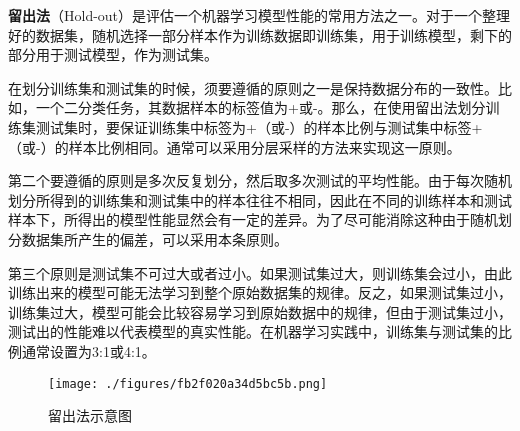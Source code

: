 
\begin{issues}
\issueDraft
\end{issues}

\textbf{留出法}（Hold-out）是评估一个机器学习模型性能的常用方法之一。对于一个整理好的数据集，随机选择一部分样本作为训练数据即训练集，用于训练模型，剩下的部分用于测试模型，作为测试集。

在划分训练集和测试集的时候，须要遵循的原则之一是保持数据分布的一致性。比如，一个二分类任务，其数据样本的标签值为+或-。那么，在使用留出法划分训练集测试集时，要保证训练集中标签为+（或-）的样本比例与测试集中标签+（或-）的样本比例相同。通常可以采用分层采样的方法来实现这一原则。

第二个要遵循的原则是多次反复划分，然后取多次测试的平均性能。由于每次随机划分所得到的训练集和测试集中的样本往往不相同，因此在不同的训练样本和测试样本下，所得出的模型性能显然会有一定的差异。为了尽可能消除这种由于随机划分数据集所产生的偏差，可以采用本条原则。

第三个原则是测试集不可过大或者过小。如果测试集过大，则训练集会过小，由此训练出来的模型可能无法学习到整个原始数据集的规律。反之，如果测试集过小，训练集过大，模型可能会比较容易学习到原始数据中的规律，但由于测试集过小，测试出的性能难以代表模型的真实性能。在机器学习实践中，训练集与测试集的比例通常设置为3:1或4:1。


\begin{figure}[ht]
\centering
\texttt{[image: ./figures/fb2f020a34d5bc5b.png]}
\caption{留出法示意图} \label{fig_holdou_1}
\end{figure}